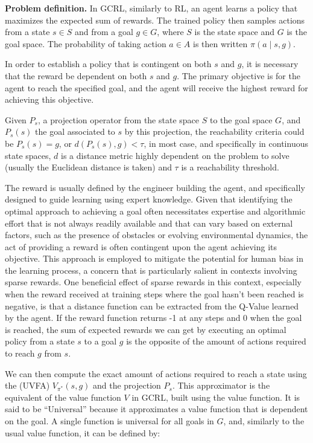 \textbf{Problem definition.}
In GCRL, similarly to RL, an agent learns a policy that maximizes the expected sum of rewards.
The trained policy then samples actions from a state $s \in S$ and from a goal $g \in G$, where $S$ is the state
space and $G$ is the goal space.
The probability of taking action $a \in A$ is then written $\pi(a \mid s, g)$.

In order to establish a policy that is contingent on both $s$ and $g$, it is necessary that the reward be dependent on both $s$ and $g$.
The primary objective is for the agent to reach the specified goal, and the agent will receive the highest reward for achieving this objective.

Given $P_s$, a projection operator from the state space $S$ to the goal space $G$, and $P_s(s)$ the goal associated to
$s$ by this projection, the reachability criteria could be $P_s(s) = g$, or $d(P_s(s), g) < \tau$, in most case, and
specifically in continuous state spaces,  $d$  is a distance metric highly dependent on the problem to solve (usually
the Euclidean distance is taken) and $\tau$ is a reachability threshold.

The reward is usually defined by the engineer building the agent, and specifically designed to guide learning using
expert knowledge.
Given that identifying the optimal approach to achieving a goal often necessitates expertise and algorithmic effort
that is not always readily available and that can vary based on external factors,
such as the presence of obstacles or evolving environmental dynamics,
the act of providing a reward is often contingent upon the agent achieving its objective.
This approach is employed to mitigate the potential for human bias in the learning process,
a concern that is particularly salient in contexts involving sparse rewards.
One beneficial effect of sparse rewards in this context, especially when the reward received at training steps
where the goal hasn't been reached is negative, is that a distance function can be extracted from the Q-Value learned by
the agent.
If the reward function returns -1 at any steps and 0 when the goal is reached, the sum of expected rewards we can get by
executing an optimal policy from a state $s$ to a goal $g$ is the opposite of the amount of actions required to
reach $g$ from $s$.

We can then compute the exact amount of actions required to reach a state using the  (UVFA)
$V_{\pi^*}(s, g)$ and the projection $P_s$.
This approximator is the equivalent of the value function $V$ in GCRL, built using the value function.
It is said to be ``Universal'' because it approximates a value function that is dependent on the goal.
A single function is universal for all goals in $G$, and, similarly to the usual value function, it can
be defined by:

